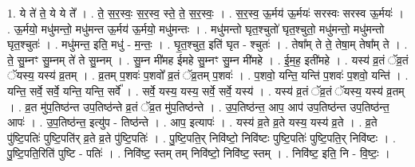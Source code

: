 \documentclass[17pt]{extarticle}
\begin{document}
1. ये ते॑ ते॒ ये ये ते᳚ । . ते॒ स॒र॒स्वः॒ स॒र॒स्व॒ स्ते॒ ते॒ स॒र॒स्वः॒ । . स॒र॒स्व॒ ऊ॒र्मय॑ ऊ॒र्मयः॑ सरस्वः सरस्व ऊ॒र्मयः॑ । . ऊ॒र्मयो॒ मधु॑मन्तो॒ मधु॑मन्त ऊ॒र्मय॑ ऊ॒र्मयो॒ मधु॑मन्तः । . मधु॑मन्तो घृत॒श्चुतो॑ घृत॒श्चुतो॒ मधु॑मन्तो॒ मधु॑मन्तो घृत॒श्चुतः॑ । . मधु॑मन्त॒ इति॒ मधु॑ - म॒न्तः॒ । . घृ॒त॒श्चुत॒ इति॑ घृत - श्चुतः॑ । . तेषा᳚म् ते ते॒ तेषा॒म् तेषा᳚म् ते । . ते॒ सु॒म्नꣳ सु॒म्नम् ते॑ ते सु॒म्नम् । . सु॒म्न मी॑मह ईमहे सु॒म्नꣳ सु॒म्न मी॑महे । . ई॒म॒ह॒ इती॑महे । . यस्य॑ व्र॒तं ॅव्र॒तं ॅयस्य॒ यस्य॑ व्र॒तम् । . व्र॒तम् प॒शवः॑ प॒शवो᳚ व्र॒तं ॅव्र॒तम् प॒शवः॑ । . प॒शवो॒ यन्ति॒ यन्ति॑ प॒शवः॑ प॒शवो॒ यन्ति॑ । . यन्ति॒ सर्वे॒ सर्वे॒ यन्ति॒ यन्ति॒ सर्वे᳚ । . सर्वे॒ यस्य॒ यस्य॒ सर्वे॒ सर्वे॒ यस्य॑ । . यस्य॑ व्र॒तं ॅव्र॒तं ॅयस्य॒ यस्य॑ व्र॒तम् । . व्र॒त मु॑प॒तिष्ठ॑न्त उप॒तिष्ठ॑न्ते व्र॒तं ॅव्र॒त मु॑प॒तिष्ठ॑न्ते । . उ॒प॒तिष्ठ॑न्त॒ आप॒ आप॑ उप॒तिष्ठ॑न्त उप॒तिष्ठ॑न्त॒ आपः॑ । . उ॒प॒तिष्ठ॑न्त॒ इत्यु॑प - तिष्ठ॑न्ते । . आप॒ इत्यापः॑ । . यस्य॑ व्र॒ते व्र॒ते यस्य॒ यस्य॑ व्र॒ते । . व्र॒ते पु॑ष्टि॒पतिः॑ पुष्टि॒पति॑र् व्र॒ते व्र॒ते पु॑ष्टि॒पतिः॑ । . पु॒ष्टि॒पति॒र् निवि॑ष्टो॒ निवि॑ष्टः पुष्टि॒पतिः॑ पुष्टि॒पति॒र् निवि॑ष्टः । . पु॒ष्टि॒पति॒रिति॑ पुष्टि - पतिः॑ । . निवि॑ष्ट॒ स्तम् तम् निवि॑ष्टो॒ निवि॑ष्ट॒ स्तम् । . निवि॑ष्ट॒ इति॒ नि - वि॒ष्टः॒ । \newline
\end{document}
